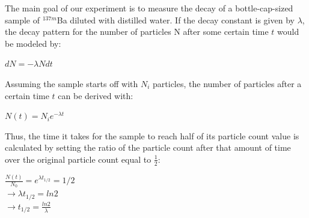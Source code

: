\documentclass[10pt,letterpaper,onecolumn]{article}
\begin{document}
The main goal of our experiment is to measure the decay of a bottle-cap-sized sample of $^{137m}$Ba diluted with distilled water. If the decay constant is given by $\lambda$, the decay pattern for the number of particles N after some certain time $t$ would be modeled by:
\begin{center}
    $dN = -\lambda N dt$
\end{center}
Assuming the sample starts off with $N_{i}$ particles, the number of particles after a certain time $t$ can be derived with:
\begin{center}
    $N(t) = N_{i}e^{-\lambda t}$
\end{center}
Thus, the time it takes for the sample to reach half of its particle count value is calculated by setting the ratio of the particle count after that amount of time over the original particle count equal to $\frac{1}{2}$:
\begin{center}
    $\frac{N(t)}{N_0} = e^{\lambda t_{1/2}} = 1/2$ \\
    $\rightarrow \lambda t_{1/2} = ln2$ \\
    $\rightarrow t_{1/2} = \frac{ln2}{\lambda}$
\end{center}
\end{document}
